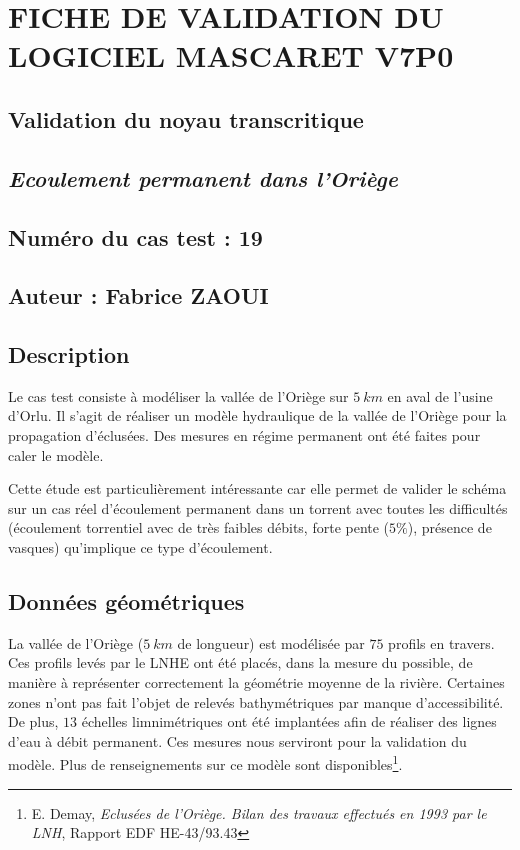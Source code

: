 \documentclass[a4paper,10pt]{article}
\begin{document}
\section*{FICHE DE VALIDATION DU LOGICIEL MASCARET V7P0}

\subsection*{Validation du noyau transcritique}

\subsection*{\emph{Ecoulement permanent dans l'Oriège}}

\subsection*{Numéro du cas test : 19}

\subsection*{Auteur : Fabrice ZAOUI}


\vspace{1cm}

\subsection*{Description}

Le cas test consiste à modéliser la vallée de l'Oriège sur $5\ km$ en aval de l'usine d'Orlu. Il s'agit de réaliser un modèle hydraulique de la vallée de l'Oriège
pour la propagation d'éclusées. Des mesures en régime permanent ont été faites pour caler le modèle.

Cette étude est particulièrement intéressante car elle permet de valider le schéma sur un cas réel d'écoulement permanent dans un torrent avec toutes les difficultés (écoulement torrentiel avec de très faibles débits, forte pente ($5\%$), présence de vasques) qu'implique ce type d'écoulement.

\subsection*{Données géométriques}

La vallée de l'Oriège ($5\ km$ de longueur) est modélisée par $75$ profils en travers. Ces profils levés par le LNHE ont été placés, dans la mesure du possible, de manière à représenter correctement la géométrie moyenne de la rivière. Certaines zones n'ont pas fait l'objet de relevés bathymétriques par manque d'accessibilité. De plus, $13$ échelles limnimétriques ont été implantées afin de réaliser des lignes d'eau à débit permanent. Ces mesures nous serviront pour la validation du modèle. Plus de renseignements sur ce modèle sont disponibles\footnote{E. Demay, \emph{Eclusées de l'Oriège. Bilan des travaux effectués en 1993 par le LNH}, Rapport EDF HE-43/93.43}.
\end{document}
